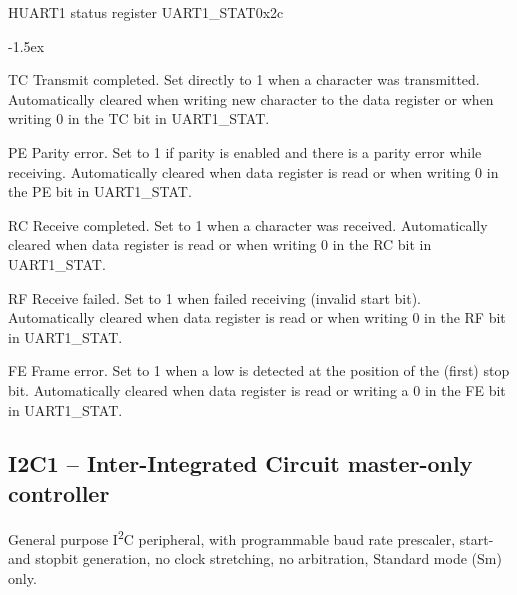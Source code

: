 \documentclass[12pt]{article}
\begin{document}
\begin{register}{H}{UART1 status register UART1\_STAT}{0x2c}
\label{uart1stat}
%
%
%
%
%
%
\regnewline%
\end{register}
\begin{regdesc}[0.8\textwidth]\begin{reglist}[0000]
\itemsep-1.5ex
\item[TC] Transmit completed. Set directly to 1 when a character was transmitted. Automatically cleared when writing new character to the data register or when writing 0 in the TC bit in \mbox{UART1\_STAT}.
\item[PE] Parity error. Set to 1 if parity is enabled and there is a parity error while receiving. Automatically cleared when data register is read or when writing 0 in the PE bit in UART1\_STAT.
\item[RC] Receive completed. Set to 1 when a character was received. Automatically cleared when data register is read or when writing 0 in the RC bit in UART1\_STAT.
\item[RF] Receive failed. Set to 1 when failed receiving (invalid start bit). Automatically cleared when data register is read or when writing 0 in the RF bit in UART1\_STAT.
\item [FE] Frame error. Set to 1 when a low is detected at the position of the (first) stop bit. Automatically cleared when data register is read or writing a 0 in the FE bit in UART1\_STAT.
\end{reglist}\end{regdesc}


\subsection{I2C1 -- Inter-Integrated Circuit master-only controller}
General purpose I\textsuperscript{2}C peripheral, with programmable baud rate prescaler, start- and stopbit generation, no clock stretching, no arbitration, Standard mode (Sm) only.
\end{document}

